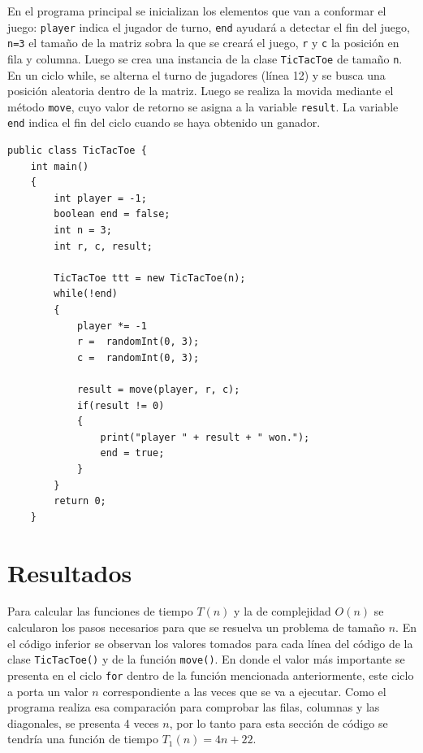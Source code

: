 En el programa principal se inicializan los elementos que van a conformar el juego: \texttt{player} indica el jugador de turno, \texttt{end} ayudará a detectar el fin del juego, \texttt{n=3} el tamaño de la matriz sobra la que se creará el juego, \texttt{r} y \texttt{c} la posición en fila y columna. Luego se crea una instancia de la clase \texttt{TicTacToe} de tamaño \texttt{n}. En un ciclo while, se alterna el turno de jugadores (línea 12) y se busca una posición aleatoria dentro de la matriz. Luego se realiza la movida mediante el método \texttt{move}, cuyo valor de retorno se asigna a la variable \texttt{result}. La variable \texttt{end} indica el fin del ciclo cuando se haya obtenido un ganador.


\begin{verbatim}
public class TicTacToe {    
    int main()
    {
        int player = -1;
        boolean end = false;
        int n = 3;
        int r, c, result;
        
        TicTacToe ttt = new TicTacToe(n);
        while(!end)
        {
            player *= -1
            r =  randomInt(0, 3);
            c =  randomInt(0, 3);
            
            result = move(player, r, c);
            if(result != 0)
            {
                print("player " + result + " won.");
                end = true;
            }
        }
        return 0;
    }
\end{verbatim}

\section{Resultados}

Para calcular las funciones de tiempo $T(n)$ y la de complejidad $O(n)$ se calcularon los pasos necesarios para que se resuelva un problema de tamaño $n$. En el código inferior se observan los valores tomados para cada línea del código de la clase \texttt{TicTacToe()} y de la función \texttt{move()}. En donde el valor más importante se presenta en el ciclo \texttt{for} dentro de la función mencionada anteriormente, este ciclo a porta un valor $n$ correspondiente a las veces que se va a ejecutar. Como el programa realiza esa comparación para comprobar las filas, columnas y las diagonales, se presenta 4 veces $n$, por lo tanto para esta sección de código se tendría una función de tiempo $T_1(n)=4n+22$. 

